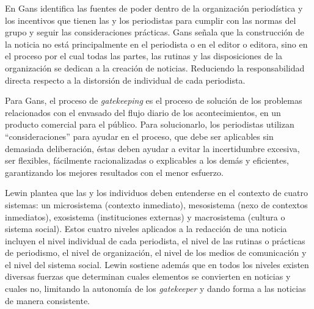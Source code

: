 
 En \cite{gans1979deciding} Gans identifica las fuentes de poder dentro de la organización periodística y los incentivos que tienen las y los periodistas para cumplir con las normas del grupo y seguir las consideraciones prácticas. Gans señala que la construcción de la noticia no está principalmente en el periodista o en el editor o editora, sino en el proceso por el cual todas las partes, las rutinas y las disposiciones de la organización se dedican a la creación de noticias. Reduciendo la responsabilidad directa respecto a la distorsión de individual de cada periodista.

Para Gans, el proceso de \emph{gatekeeping} es el proceso de solución de los problemas relacionados con el envasado del flujo diario de los acontecimientos, en un producto comercial para el público. Para solucionarlo, los periodistas utilizan ``consideraciones'' para ayudar en el proceso, que debe ser aplicables sin demasiada deliberación, éstas deben ayudar a evitar la incertidumbre excesiva, ser flexibles, fácilmente racionalizadas o explicables a los demás y eficientes, garantizando los mejores resultados con el menor esfuerzo. 


Lewin \cite{lewin1951field} plantea que las y los individuos deben entenderse en el contexto de cuatro sistemas: un microsistema (contexto inmediato), mesosistema (nexo de contextos inmediatos), exosistema (instituciones externas) y macrosistema (cultura o sistema social). Estos cuatro niveles aplicados a la redacción de una noticia incluyen el nivel individual de cada periodista, el nivel de las rutinas o prácticas de periodismo, el nivel de organización, el nivel de los medios de comunicación y el nivel del sistema social. Lewin sostiene además que en todos los niveles existen diversas fuerzas que determinan cuales elementos se convierten en noticias y cuales no, limitando la autonomía de los \emph{gatekeeper} y dando forma a las noticias de manera consistente.

